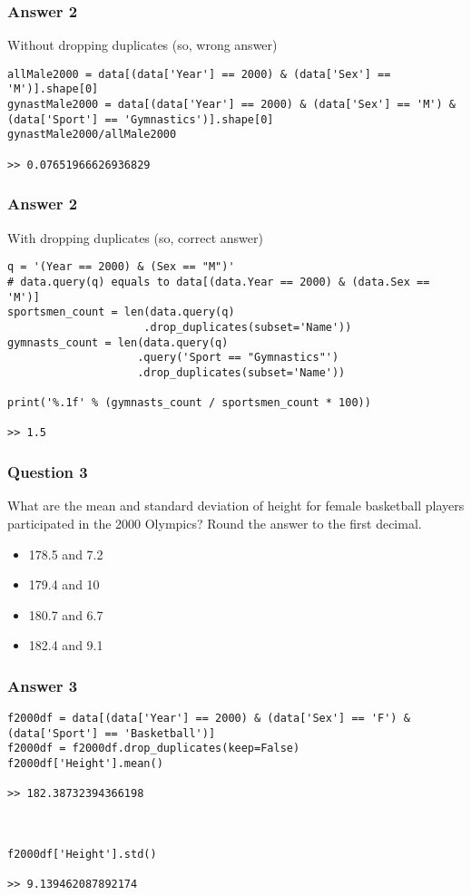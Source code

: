\begin{frame}[fragile]\frametitle{Answer 2}
Without dropping duplicates (so, wrong answer)
\begin{lstlisting}
allMale2000 = data[(data['Year'] == 2000) & (data['Sex'] == 'M')].shape[0]
gynastMale2000 = data[(data['Year'] == 2000) & (data['Sex'] == 'M') & (data['Sport'] == 'Gymnastics')].shape[0]
gynastMale2000/allMale2000

>> 0.07651966626936829
\end{lstlisting}

\end{frame}

\begin{frame}[fragile]\frametitle{Answer 2}
With dropping duplicates (so, correct answer)
\begin{lstlisting}
q = '(Year == 2000) & (Sex == "M")'
# data.query(q) equals to data[(data.Year == 2000) & (data.Sex == 'M')]
sportsmen_count = len(data.query(q)
                     .drop_duplicates(subset='Name'))
gymnasts_count = len(data.query(q)
                    .query('Sport == "Gymnastics"')
                    .drop_duplicates(subset='Name'))

print('%.1f' % (gymnasts_count / sportsmen_count * 100))

>> 1.5
\end{lstlisting}

\end{frame}

\begin{frame}[fragile]\frametitle{Question 3}	
What are the mean and standard deviation of height for female basketball players participated in the 2000 Olympics? Round the answer to the first decimal.
\begin{itemize}
\item 178.5 and 7.2
\item 179.4 and 10
\item 180.7 and 6.7
\item 182.4 and 9.1
\end{itemize}

\end{frame}

\begin{frame}[fragile]\frametitle{Answer 3}
\begin{lstlisting}
f2000df = data[(data['Year'] == 2000) & (data['Sex'] == 'F') & (data['Sport'] == 'Basketball')]
f2000df = f2000df.drop_duplicates(keep=False)
f2000df['Height'].mean()

>> 182.38732394366198



f2000df['Height'].std()

>> 9.139462087892174
\end{lstlisting}

\end{frame}

